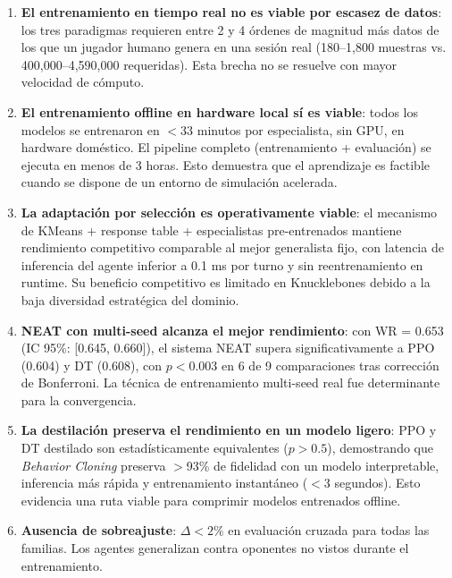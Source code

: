 \begin{enumerate}
    \item \textbf{El entrenamiento en tiempo real no es viable por escasez de datos}: los tres paradigmas requieren entre 2 y 4 órdenes de magnitud más datos de los que un jugador humano genera en una sesión real (180--1,800 muestras vs. 400,000--4,590,000 requeridas). Esta brecha no se resuelve con mayor velocidad de cómputo.

    \item \textbf{El entrenamiento offline en hardware local sí es viable}: todos los modelos se entrenaron en $<$33 minutos por especialista, sin GPU, en hardware doméstico. El pipeline completo (entrenamiento + evaluación) se ejecuta en menos de 3 horas. Esto demuestra que el aprendizaje es factible cuando se dispone de un entorno de simulación acelerada.

    \item \textbf{La adaptación por selección es operativamente viable}: el mecanismo de KMeans + response table + especialistas pre-entrenados mantiene rendimiento competitivo comparable al mejor generalista fijo, con latencia de inferencia del agente inferior a 0.1 ms por turno y sin reentrenamiento en runtime. Su beneficio competitivo es limitado en Knucklebones debido a la baja diversidad estratégica del dominio.

    \item \textbf{NEAT con multi-seed alcanza el mejor rendimiento}: con WR = 0.653 (IC 95\%: [0.645, 0.660]), el sistema NEAT supera significativamente a PPO (0.604) y DT (0.608), con $p < 0.003$ en 6 de 9 comparaciones tras corrección de Bonferroni. La técnica de entrenamiento multi-seed real fue determinante para la convergencia.

    \item \textbf{La destilación preserva el rendimiento en un modelo ligero}: PPO y DT destilado son estadísticamente equivalentes ($p > 0.5$), demostrando que \textit{Behavior Cloning} preserva $>$93\% de fidelidad con un modelo interpretable, inferencia más rápida y entrenamiento instantáneo ($<$3 segundos). Esto evidencia una ruta viable para comprimir modelos entrenados offline.

    \item \textbf{Ausencia de sobreajuste}: $\Delta < 2\%$ en evaluación cruzada para todas las familias. Los agentes generalizan contra oponentes no vistos durante el entrenamiento.
\end{enumerate}

